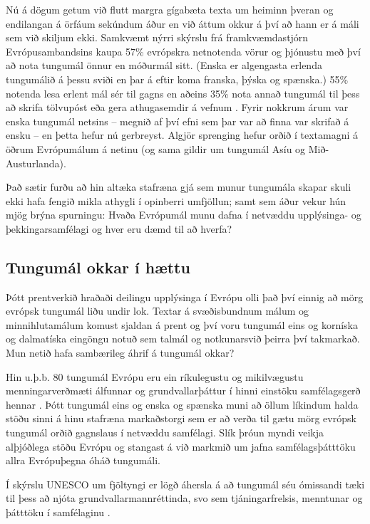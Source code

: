 \documentclass{../../metanetpaper}
\begin{document}
\begin{multicols}{2}
Nú á dögum getum við flutt margra gígabæta texta um heiminn þveran og endilangan á örfáum sekúndum áður en við áttum okkur á því að hann er á máli sem við skiljum ekki. Samkvæmt nýrri skýrslu frá framkvæmdastjórn Evrópusambandsins kaupa 57\% evrópskra netnotenda vörur og þjónustu með því að nota tungumál önnur en móðurmál sitt. (Enska er algengasta erlenda tungumálið á þessu sviði en þar á eftir koma franska, þýska og spænska.) 55\% notenda lesa erlent mál sér til gagns en aðeins 35\% nota annað tungumál til þess að skrifa tölvupóst eða gera athugasemdir á vefnum \cite{EC1}. Fyrir nokkrum árum var enska tungumál netsins -- megnið af því efni sem þar var að finna var skrifað á ensku -- en þetta hefur nú gerbreyst. Algjör sprenging hefur orðið í textamagni á öðrum Evrópumálum á netinu (og sama gildir um tungumál Asíu og Mið-Austurlanda). 

Það sætir furðu að hin altæka stafræna gjá sem munur tungumála skapar skuli ekki hafa fengið mikla athygli í opinberri umfjöllun; samt sem áður vekur hún mjög brýna spurningu: Hvaða Evrópumál munu dafna í netvæddu upplýsinga- og þekkingarsamfélagi og hver eru dæmd til að hverfa?

\subsection{Tungumál okkar í hættu}

Þótt prentverkið hraðaði deilingu upplýsinga í Evrópu olli það því einnig að mörg evrópsk tungumál liðu undir lok. Textar á svæðisbundnum málum og minnihlutamálum komust sjaldan á prent og því voru tungumál eins og korníska og dalmatíska eingöngu notuð sem talmál og notkunarsvið þeirra því takmarkað. Mun netið hafa sambærileg áhrif á tungumál okkar? 

Hin u.þ.b. 80 tungumál Evrópu eru ein ríkulegustu og mikilvægustu menningarverðmæti álfunnar og grundvallarþáttur í hinni einstöku samfélagsgerð hennar \cite{EC2}. Þótt tungumál eins og enska og spænska muni að öllum líkindum halda stöðu sinni á hinu stafræna markaðstorgi sem er að verða til gætu mörg evrópsk tungumál orðið gagnslaus í netvæddu samfélagi. Slík þróun myndi veikja alþjóðlega stöðu Evrópu og stangast á við markmið um jafna samfélagsþátttöku allra Evrópuþegna óháð tungumáli.


Í skýrslu UNESCO um fjöltyngi er lögð áhersla á að tungumál séu ómissandi tæki til þess að njóta grundvallarmannréttinda, svo sem tjáningarfrelsis, menntunar og þátttöku í samfélaginu \cite{Unesco1}.


\end{multicols}
\end{document}
